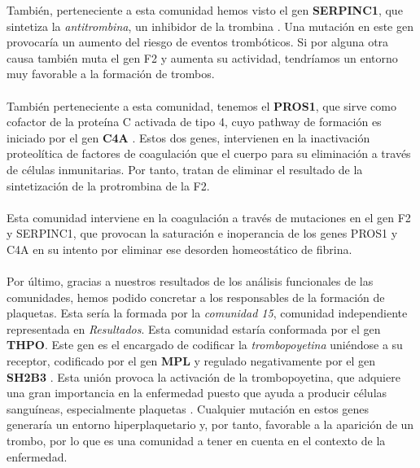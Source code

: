  También, perteneciente a esta comunidad hemos visto el gen \textbf{SERPINC1}, que sintetiza la \textit{antitrombina}, un inhibidor de la trombina \cite{SERPINC1}. Una mutación en este gen provocaría un aumento del riesgo de eventos trombóticos. Si por alguna otra causa también muta el gen F2 y aumenta su actividad, tendríamos un entorno muy favorable a la formación de trombos.\\\\
También perteneciente a esta comunidad, tenemos el \textbf{PROS1}, que sirve como cofactor de la proteína C activada de tipo 4, cuyo pathway de formación es iniciado por el gen \textbf{C4A} \cite{PROS1}. Estos dos genes, intervienen en la inactivación proteolítica de factores de coagulación que el cuerpo para su eliminación a través de células inmunitarias. Por tanto, tratan de eliminar el resultado de la sintetización de la protrombina de la F2.\\\\ Esta comunidad interviene en la coagulación a través de mutaciones en el gen F2 y SERPINC1, que provocan la saturación e inoperancia de los genes PROS1 y C4A en su intento por eliminar ese desorden homeostático de fibrina.\\\\
Por último, gracias a nuestros resultados de los análisis funcionales de las comunidades, hemos podido concretar a los responsables de la formación de plaquetas. Esta sería la formada por la \textit{comunidad 15}, comunidad independiente representada en \textit{Resultados}. Esta comunidad estaría conformada por el gen \textbf{THPO}. Este gen es el encargado de codificar la \textit{trombopoyetina} uniéndose a su receptor\cite{THPO_MPL}, codificado por el gen \textbf{MPL} \cite{THPO_MPL} y regulado negativamente por el gen \textbf{SH2B3} \cite{SH2B3}. Esta unión provoca la activación de la trombopoyetina, que adquiere una gran importancia en la enfermedad puesto que ayuda a producir células sanguíneas, especialmente plaquetas \cite{THPO_MPL}. Cualquier mutación en estos genes generaría un entorno hiperplaquetario y, por tanto, favorable a la aparición de un trombo, por lo que es una comunidad a tener en cuenta en el contexto de la enfermedad.


